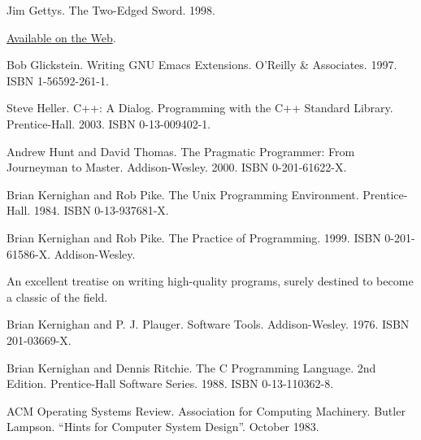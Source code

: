 \documentclass[12pt,oneside]{book}
\begin{document}
\begin{common-format}
\begin{thebibliography}{9}
 Jim Gettys. The Two-Edged Sword. 1998.

\href{http://freshmeat.net/articles/view/122/}{Available on the Web}.

 Bob Glickstein. Writing GNU Emacs Extensions. O'Reilly \&{} Associates. 1997. ISBN 1-56592-261-1.

%
%
%
%
%
%
%
%

 Steve Heller. C++: A Dialog. Programming with the C++ Standard Library. Prentice-Hall. 2003. ISBN 0-13-009402-1.

 Andrew Hunt and David Thomas. The Pragmatic Programmer: From Journeyman to Master. Addison-Wesley. 2000. ISBN 0-201-61622-X.

%
%
 Brian Kernighan and Rob Pike. The Unix Programming Environment. Prentice-Hall. 1984. ISBN 0-13-937681-X.

 Brian Kernighan and Rob Pike. The Practice of Programming. 1999. ISBN 0-201-61586-X. Addison-Wesley.

An excellent treatise on writing high-quality programs, surely destined to become a classic of the field.

 Brian Kernighan and P. J. Plauger. Software Tools. Addison-Wesley. 1976. ISBN 201-03669-X.

 Brian Kernighan and Dennis Ritchie. The C Programming Language. 2nd Edition. Prentice-Hall Software Series. 1988. ISBN 0-13-110362-8.

 ACM Operating Systems Review. Association for Computing Machinery. Butler Lampson. “Hints for Computer System Design”. October 1983.


\end{thebibliography}
\end{common-format}
\end{document}
